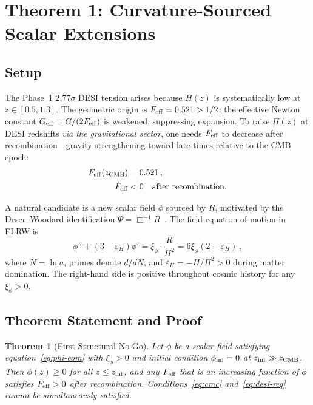 \documentclass[12pt,a4paper]{article}
\newcommand{\Feff}{F_{\rm eff}}
\theoremstyle{plain}
\newtheorem{theorem}{Theorem}
\begin{document}
\section{Theorem 1: Curvature-Sourced Scalar Extensions}
\label{sec:nogo1}

\subsection{Setup}
\label{sec:nogo1-setup}

The Phase~1 $2.77\sigma$ DESI tension arises because $H(z)$ is systematically
low at $z\in[0.5,1.3]$. The geometric origin is $\Feff = 0.521 > 1/2$:
the effective Newton constant $G_{\rm eff}=G/(2\Feff)$ is weakened, suppressing
expansion. To raise $H(z)$ at DESI redshifts \emph{via the gravitational sector},
one needs $\Feff$ to decrease after recombination---gravity strengthening
toward late times relative to the CMB epoch:
\begin{align}
  \Feff(z_{\rm CMB}) &= 0.521\,, \label{eq:cmc} \\
  \dot\Feff &< 0 \quad\text{after recombination.} \label{eq:desi-req}
\end{align}

A natural candidate is a new scalar field $\phi$ sourced by $R$, motivated by
the Deser--Woodard identification $\Psi=\Box^{-1}R$~\cite{DeserWoodard2007}. The field equation of
motion in FLRW is
\begin{equation}
  \phi'' + (3-\varepsilon_H)\phi' = \xi_\phi \cdot \frac{R}{H^2}
  = 6\xi_\phi(2-\varepsilon_H)\,,
  \label{eq:phi-eom}
\end{equation}
where $N=\ln a$, primes denote $d/dN$, and $\varepsilon_H=-\dot{H}/H^2>0$
during matter domination. The right-hand side is positive throughout cosmic
history for any $\xi_\phi>0$.

\subsection{Theorem Statement and Proof}
\label{sec:nogo1-proof}

\begin{theorem}[First Structural No-Go]
\label{thm:nogo1}
Let $\phi$ be a scalar field satisfying equation~\eqref{eq:phi-eom} with
$\xi_\phi>0$ and initial condition $\phi_{\rm ini}=0$ at $z_{\rm ini}\gg
z_{\rm CMB}$. Then $\phi(z)\geq0$ for all $z\leq z_{\rm ini}$, and any
$\Feff$ that is an increasing function of $\phi$ satisfies $\dot\Feff>0$
after recombination. Conditions~\eqref{eq:cmc} and~\eqref{eq:desi-req}
cannot be simultaneously satisfied.
\end{theorem}
\end{document}
